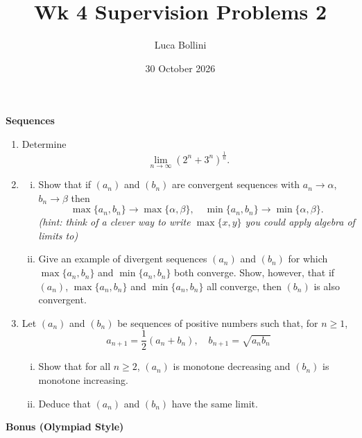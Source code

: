 \documentclass{article}
\title{Wk 4 Supervision Problems 2}
\author{Luca Bollini}
\date{30 October 2026}
\begin{document}
\maketitle

\begin{center}
\huge{\textbf{Sequences}}
\end{center}

\begin{enumerate}
    \item Determine $$\lim\limits_{n\to\infty} (2^n+3^n)^\frac{1}{n}.$$
    
    \item \begin{enumerate}[(i)]
    \item Show that if $(a_n)$ and $(b_n)$ are convergent sequences with $a_n\to \alpha$, $b_n\to\beta$ then
    \[
    \max\{a_n,b_n\} \to \max\{\alpha,\beta\},\quad\min\{a_n,b_n\} \to \min\{\alpha,\beta\}.
    \]
    \emph{(hint: think of a clever way to write $\max\{x,y\}$ you could apply algebra of limits to)}
    \item Give an example of divergent sequences $(a_n)$ and $(b_n)$ for which $\max\{a_n,b_n\}$ and $\min\{a_n,b_n\}$ both converge. Show, however, that if $(a_n)$, $\max\{a_n,b_n\}$ and $\min\{a_n,b_n\}$ all converge, then $(b_n)$ is also convergent.
    \end{enumerate}
    
    \item Let $(a_n)$ and $(b_n)$ be sequences of positive numbers such that, for $n\geq 1$,
    \[
    a_{n+1} = \frac{1}{2}(a_n+b_n),\quad b_{n+1} = \sqrt{a_nb_n}
    \]
    \begin{enumerate}[(i)]
        \item Show that for all $n\geq 2$, $(a_n)$ is monotone decreasing and $(b_n)$ is monotone increasing.
        \item Deduce that $(a_n)$ and $(b_n)$ have the same limit.
    \end{enumerate}
\end{enumerate}

\begin{center}
\huge{\textbf{Bonus (Olympiad Style)}}
\end{center}

\end{document}
